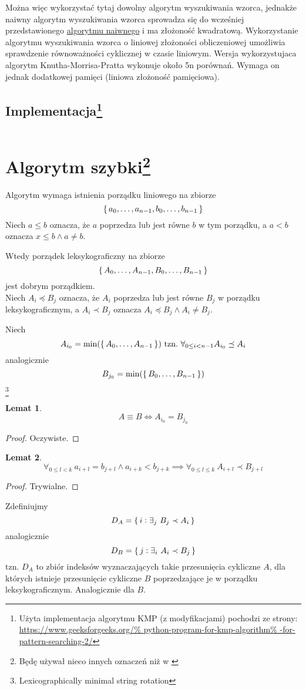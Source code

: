 \documentclass{scrartcl}
\theoremstyle{definition}
\theoremstyle{plain}
\theoremstyle{remark}
\theoremstyle{plain}
\newtheorem{lemma_equiv_if_lex_min_eq}{Lemat}[section]
\newtheorem{lemma_k_shift_greater}
[lemma_equiv_if_lex_min_eq]{Lemat}
\theoremstyle{definition}
\theoremstyle{plain}
\begin{document}
Można więc wykorzystać tytaj dowolny algorytm wyszukiwania wzorca,
jednakże naiwny algorytm wyszukiwania wzorca sprowadza się do
wcześniej przedstawionego
\hyperref[sec:naive_alg]{algorytmu naiwnego}
i ma złożoność kwadratową.
Wykorzystanie algorytmu wyszukiwania wzorca
o liniowej złożoności obliczeniowej
umożliwia sprawdzenie równoważności cyklicznej
w czasie liniowym.\cite{alg}
Wersja wykorzystujaca algorytm Knutha-Morrisa-Pratta
wykonuje około 5n porównań.\cite{shiloach1979}
Wymaga on jednak dodatkowej pamięci (liniowa złożoność pamięciowa).
\pagebreak
\subsection[Implementacja]{Implementacja\footnote{
		Użyta implementacja algorytmu KMP (z modyfikacjami)
		pochodzi ze strony:\\
		\url{https://www.geeksforgeeks.org/%
			python-program-for-kmp-algorithm%
			-for-pattern-searching-2/}
	}}
\inputminted[fontsize=\normalsize]{python3}{pattern_matching.py}
\pagebreak
\section[Algorytm szybki]{Algorytm szybki\footnote{
	  Będę używał nieco innych oznaczeń niż w \cite{shiloach1979}
  }}
Algorytm wymaga istnienia porządku liniowego na zbiorze
\[\set{a_0,\dots,a_{n-1},b_0,\dots,b_{n-1}}\]
Niech \(a\le b\) oznacza, że \(a\) poprzedza
lub jest równe \(b\) w tym porządku, a \(a< b\) oznacza
\(x\le b \land a\neq b\).

Wtedy porządek leksykograficzny
na zbiorze \[\set{A_0,\dots,A_{n-1},B_0,\dots,B_{n-1}}\]
jest dobrym porządkiem.\\
Niech \(A_i\preceq B_j\) oznacza, że \(A_i\) poprzedza
lub jest równe \(B_j\) w porządku leksykograficznym,
a \(A_i\prec B_j\) oznacza \(A_i\preceq B_j \land A_i\neq B_j\).

Niech
\[A_{i_0}=\min(\set{A_0,\dots,A_{n-1}})
	\ \text{tzn.}\ \forall_{0\le i<n-1}A_{i_0}\preceq A_i\]
analogicznie
\[B_{j_0}=\min(\set{B_0,\dots,B_{n-1}})\]\footnote{
	Lexicographically minimal string rotation
}
\begin{lemma_equiv_if_lex_min_eq}
	\label{lem:equivalence_if_lex_min_eq}
	\[A\equiv B \iff A_{i_0}=B_{j_0}\]
\end{lemma_equiv_if_lex_min_eq}
\begin{proof}
	Oczywiste.
\end{proof}
\begin{lemma_k_shift_greater}
	\label{lem:k_shift_greater}
	\[\forall_{0\le l<k}\ a_{i+l}=b_{j+l} \land a_{i+k}<b_{j+k}
		\implies \forall_{0\le l\le k}\ A_{i+l}\prec B_{j+l}\]
\end{lemma_k_shift_greater}
\begin{proof}
	Trywialne.
\end{proof}
Zdefiniujmy
\[D_A=\set{i:\exists_j\ B_j\prec A_i}\]
analogicznie
\[D_B=\set{j:\exists_i\ A_i\prec B_j}\]
tzn. \(D_A\) to zbiór indeksów
wyznaczających takie przesunięcia cykliczne \(A\),
dla których istnieje przesunięcie cykliczne \(B\)
poprzedzające je w porządku leksykograficznym.
Analogicznie dla \(B\).
\pagebreak
\end{document}
